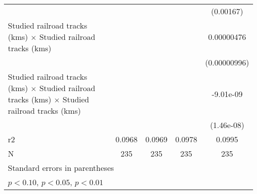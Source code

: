 {\begin{tabular}{l*{4}{c}}
                    &                     &                     &                     &   (0.00167)         \\
[1em]
Studied railroad tracks (kms) $\times$ Studied railroad tracks (kms)&                     &                     &                     &  0.00000476         \\
                    &                     &                     &                     &(0.00000996)         \\
[1em]
Studied railroad tracks (kms) $\times$ Studied railroad tracks (kms) $\times$ Studied railroad tracks (kms)&                     &                     &                     &   -9.01e-09         \\
                    &                     &                     &                     &  (1.46e-08)         \\
\hline
r2                  &      0.0968         &      0.0969         &      0.0978         &      0.0995         \\
N                   &         235         &         235         &         235         &         235         \\
\hline\hline
\multicolumn{5}{l}{\footnotesize Standard errors in parentheses}\\
\multicolumn{5}{l}{\footnotesize \sym{*} \(p<0.10\), \sym{**} \(p<0.05\), \sym{***} \(p<0.01\)}\\
\end{tabular}
}
